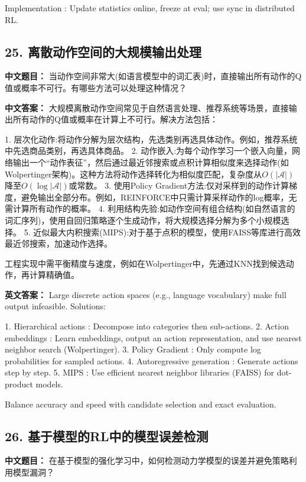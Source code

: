 \documentclass[10pt,a4paper]{ctexart}
\begin{document}
 Implementation : Update statistics online, freeze at eval; use sync in distributed RL.

\subsection*{25. 离散动作空间的大规模输出处理}
\textbf{中文题目：} 当动作空间非常大(如语言模型中的词汇表)时，直接输出所有动作的Q值或概率不可行。有哪些方法可以处理这种情况？

\textbf{中文答案：}  
大规模离散动作空间常见于自然语言处理、推荐系统等场景，直接输出所有动作的Q值或概率在计算上不可行。解决方法包括：

1.  层次化动作:将动作分解为层次结构，先选类别再选具体动作。例如，推荐系统中先选商品类别，再选具体商品。
2.  动作嵌入:为每个动作学习一个嵌入向量，网络输出一个“动作表征”，然后通过最近邻搜索或点积计算相似度来选择动作(如Wolpertinger架构)。这种方法将动作选择转化为相似度匹配，复杂度从\(O(|\mathcal{A}|)\)降至\(O(\log|\mathcal{A}|)\)或常数。
3.  使用Policy Gradient方法:仅对采样到的动作计算梯度，避免输出全部分布。例如，REINFORCE中只需计算采样动作的log概率，无需计算所有动作的概率。
4.  利用结构先验:如动作空间有组合结构(如自然语言的词汇序列)，使用自回归策略逐个生成动作，将大规模选择分解为多个小规模选择。
5.  近似最大内积搜索(MIPS):对于基于点积的模型，使用FAISS等库进行高效最近邻搜索，加速动作选择。

工程实现中需平衡精度与速度，例如在Wolpertinger中，先通过KNN找到候选动作，再计算精确值。

\textbf{英文答案：}  
Large discrete action spaces (e.g., language vocabulary) make full output infeasible. Solutions:

1.  Hierarchical actions : Decompose into categories then sub-actions.
2.  Action embeddings : Learn embeddings, output an action representation, and use nearest neighbor search (Wolpertinger).
3.  Policy Gradient : Only compute log probabilities for sampled actions.
4.  Autoregressive generation : Generate actions step by step.
5.  MIPS : Use efficient nearest neighbor libraries (FAISS) for dot-product models.

Balance accuracy and speed with candidate selection and exact evaluation.

\subsection*{26. 基于模型的RL中的模型误差检测}
\textbf{中文题目：} 在基于模型的强化学习中，如何检测动力学模型的误差并避免策略利用模型漏洞？
\end{document}
